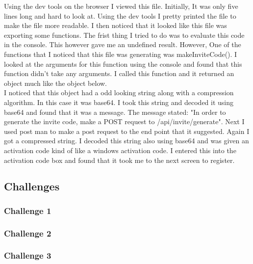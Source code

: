 \documentclass[letterpaper, onecolumn,10pt]{IEEEtran}
\begin{document}
		Using the dev tools on the browser I viewed this file. Initially, It was only five lines long and hard to look at. Using the dev tools I pretty printed the file to make the file more readable. I then noticed that it looked like this file was exporting some functions. The frist thing I tried to do was to evaluate this code in the console. This however gave me an undefined result. However, One of the functions that I noticed that this file was generating was makeInviteCode(). I looked at the arguments for this function using the console and found that this function didn't take any arguments. I called this function and it returned an object much like the object below.\\
		
		I noticed that this object had a odd looking string along with a compression algorithm. In this case it was base64. I took this string and decoded it using base64 and found that it was a message. The message stated: "In order to generate the invite code, make a POST request to /api/invite/generate". Next I used post man to make a post request to the end point that it suggested. Again I got a compressed string. I decoded this string also using base64 and was given an activation code kind of like a windows activation code. I entered this into the activation code box and found that it took me to the next screen to register.\\
		
	    \subsection{Challenges}
	        \subsubsection{Challenge 1}
	        
	        \subsubsection{Challenge 2}
	        
	        \subsubsection{Challenge 3}
		
		
		
\end{document}
